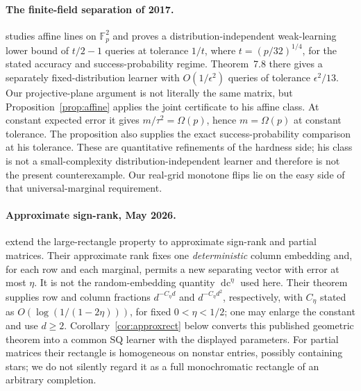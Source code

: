\documentclass[11pt]{article}
\DeclareMathOperator{\dc}{dc}
\newcommand{\1}{\mathbf 1}
\begin{document}
\paragraph{The finite-field separation of 2017.}
\citet[Theorem~7.7]{Feldman17} studies affine lines on $\mathbb F_p^2$ and proves a distribution-independent weak-learning lower bound of $t/2-1$ queries at tolerance $1/t$, where $t=(p/32)^{1/4}$, for the stated accuracy and success-probability regime. Theorem~7.8 there gives a separately fixed-distribution learner with $O(1/\epsilon^2)$ queries of tolerance $\epsilon^2/13$. Our projective-plane argument is not literally the same matrix, but Proposition~\ref{prop:affine} applies the joint certificate to his affine class. At constant expected error it gives $m/\tau^2=\Omega(p)$, hence $m=\Omega(p)$ at constant tolerance. The proposition also supplies the exact success-probability comparison at his tolerance. These are quantitative refinements of the hardness side; his class is not a small-complexity distribution-independent learner and therefore is not the present counterexample. Our real-grid monotone flips lie on the easy side of that universal-marginal requirement.

\paragraph{Approximate sign-rank, May 2026.}
\citet[Theorem~1.3]{BHKR26} extend the large-rectangle property to approximate sign-rank and partial matrices. Their approximate rank fixes one \emph{deterministic} column embedding and, for each row and each marginal, permits a new separating vector with error at most $\eta$. It is not the random-embedding quantity $\dc^\eta$ used here. Their theorem supplies row and column fractions $d^{-C_\eta d}$ and $d^{-C_\eta d^2}$, respectively, with $C_\eta$ stated as $O(\log(1/(1-2\eta)))$, for fixed $0<\eta<1/2$; one may enlarge the constant and use $d\ge2$. Corollary~\ref{cor:approxrect} below converts this published geometric theorem into a common SQ learner with the displayed parameters. For partial matrices their rectangle is homogeneous on nonstar entries, possibly containing stars; we do not silently regard it as a full monochromatic rectangle of an arbitrary completion.
\end{document}
